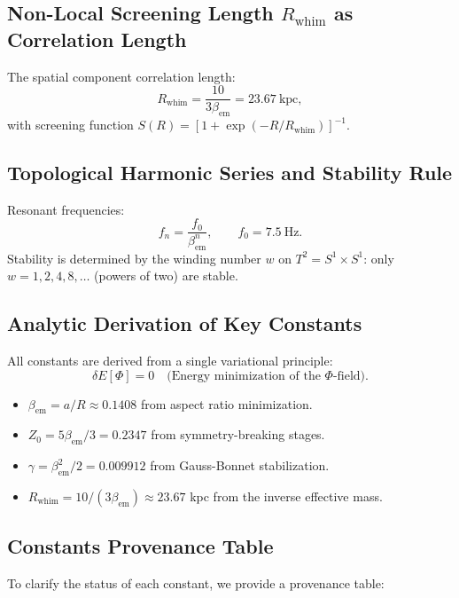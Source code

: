 \documentclass[12pt, a4paper]{article}
\begin{document}
\subsection{Non-Local Screening Length $R_{\mathrm{whim}}$ as Correlation Length}
The spatial component correlation length:
\begin{equation}
R_{\mathrm{whim}} = \frac{10}{3\beta_{\mathrm{em}}} = 23.67\ \mathrm{kpc},
\label{eq:screening}
\end{equation}
with screening function $S(R) = [1 + \exp(-R/R_{\mathrm{whim}})]^{-1}$.

\subsection{Topological Harmonic Series and Stability Rule}
Resonant frequencies:
\begin{equation}
f_n = \frac{f_0}{\beta_{\mathrm{em}}^n}, \qquad f_0 = 7.5\ \mathrm{Hz}.
\label{eq:freqseries}
\end{equation}
Stability is determined by the winding number $w$ on $T^2 = S^1 \times S^1$: only $w = 1,2,4,8,\dots$ (powers of two) are stable.

\subsection{Analytic Derivation of Key Constants}
All constants are derived from a single variational principle:
\begin{equation}
\delta E[\Phi] = 0 \quad \text{(Energy minimization of the $\Phi$-field)}.
\label{eq:variational}
\end{equation}
\begin{itemize}
    \item $\beta_{\mathrm{em}} = a/R \approx 0.1408$ from aspect ratio minimization.
    \item $Z_0 = 5\beta_{\mathrm{em}}/3 = 0.2347$ from symmetry-breaking stages.
    \item $\gamma = \beta_{\mathrm{em}}^2/2 = 0.009912$ from Gauss-Bonnet stabilization.
    \item $R_{\mathrm{whim}} = 10/(3\beta_{\mathrm{em}}) \approx 23.67$ kpc from the inverse effective mass.
\end{itemize}

\subsection{Constants Provenance Table}
To clarify the status of each constant, we provide a provenance table:
\end{document}
